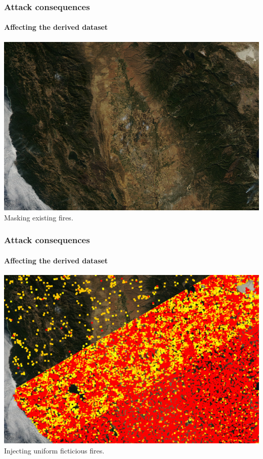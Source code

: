 \documentclass{beamer}
\begin{document}
\begin{frame}
  \frametitle{Attack consequences}
  \framesubtitle{Affecting the derived dataset}
  \includegraphics[width=\textwidth]{images/injection/masked_0.jpg}
  \newline
  \centering
  Masking existing fires.
\end{frame}

\begin{frame}
  \frametitle{Attack consequences}
  \framesubtitle{Affecting the derived dataset}
  \includegraphics[width=\textwidth]{images/injection/random_combined_diagonal.jpg}
  \newline
  \centering
  Injecting uniform ficticious fires.
\end{frame}
\end{document}
